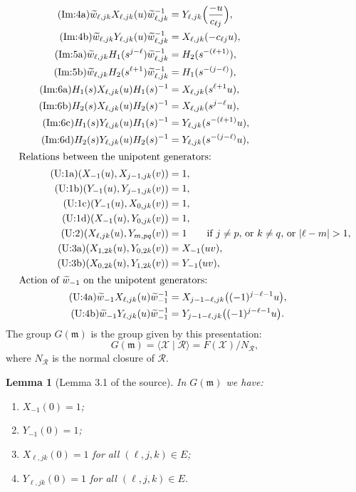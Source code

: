 \documentclass[11pt]{article}
\newtheorem{lemma}[theorem]{Lemma}
\theoremstyle{definition}
\theoremstyle{remark}
\newcommand{\cX}{\mathcal{X}}
\newcommand{\cR}{\mathcal{R}}
\newcommand{\wt}{\widetilde{w}}
\begin{document}
\begin{align*}
\tag{Im:4a} \wt_{\ell,jk}X_{\ell,jk}(u)\wt_{\ell,jk}^{-1}&=Y_{\ell,jk}\Bigl(\frac{-u}{c_{\ell j}}\Bigr),\\
\tag{Im:4b} \wt_{\ell,jk}Y_{\ell,jk}(u)\wt_{\ell,jk}^{-1}&=X_{\ell,jk}(-c_{\ell j}u),\\
\tag{Im:5a} \wt_{\ell,jk}H_1(s^{j-\ell})\wt_{\ell,jk}^{-1}&=H_2(s^{-(\ell+1)}),\\
\tag{Im:5b} \wt_{\ell,jk}H_2(s^{\ell+1})\wt_{\ell,jk}^{-1}&=H_1(s^{-(j-\ell)}),\\
\tag{Im:6a} H_1(s)X_{\ell,jk}(u)H_1(s)^{-1}&=X_{\ell,jk}(s^{\ell+1}u),\\
\tag{Im:6b} H_2(s)X_{\ell,jk}(u)H_2(s)^{-1}&=X_{\ell,jk}(s^{j-\ell}u),\\
\tag{Im:6c} H_1(s)Y_{\ell,jk}(u)H_1(s)^{-1}&=Y_{\ell,jk}(s^{-(\ell+1)}u),\\
\tag{Im:6d} H_2(s)Y_{\ell,jk}(u)H_2(s)^{-1}&=Y_{\ell,jk}(s^{-(j-\ell)}u),\\
\intertext{Relations between the unipotent generators:}
\tag{U:1a} (X_{-1}(u),X_{j-1,jk}(v))&=1,\\
\tag{U:1b} (Y_{-1}(u),Y_{j-1,jk}(v))&=1,\\
\tag{U:1c} (Y_{-1}(u),X_{0,jk}(v))&=1,\\
\tag{U:1d} (X_{-1}(u),Y_{0,jk}(v))&=1,\\
\tag{U:2} (X_{\ell,jk}(u),Y_{m,pq}(v))&=1\qquad\text{if $j\neq p$, or $k\neq q$, or $|\ell-m|>1$},\\
\tag{U:3a} (X_{1,2k}(u),Y_{0,2k}(v))&=X_{-1}(uv),\\
\tag{U:3b} (X_{0,2k}(u),Y_{1,2k}(v))&=Y_{-1}(uv),\\
\intertext{Action of $\wt_{-1}$ on the unipotent generators:}
\tag{U:4a} \wt_{-1}X_{\ell,jk}(u)\wt_{-1}^{-1}&=X_{j-1-\ell,jk}\bigl((-1)^{j-\ell-1}u\bigr),\\
\tag{U:4b} \wt_{-1}Y_{\ell,jk}(u)\wt_{-1}^{-1}&=Y_{j-1-\ell,jk}\bigl((-1)^{j-\ell-1}u\bigr).
\end{align*}
The group $G(\mathfrak{m})$ is the group given by this presentation:
\[
G(\mathfrak{m})=\langle\cX\mid\cR\rangle=F(\cX)/N_\cR,
\]
where $N_\cR$ is the normal closure of $\cR$.

\begin{lemma}[Lemma 3.1 of the source]\label{lem:source}
In $G(\mathfrak{m})$ we have:
\begin{enumerate}
\item[(a)] $X_{-1}(0)=1$;
\item[(b)] $Y_{-1}(0)=1$;
\item[(c)] $X_{\ell,jk}(0)=1$ for all $(\ell,j,k)\in E$;
\item[(d)] $Y_{\ell,jk}(0)=1$ for all $(\ell,j,k)\in E$.
\end{enumerate}
\end{lemma}
\end{document}
